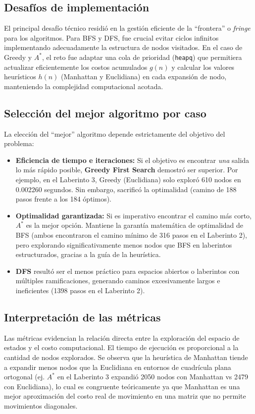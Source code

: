 \documentclass[12pt,a4paper]{article}
\begin{document}
\subsection{Desafíos de implementación}
El principal desafío técnico residió en la gestión eficiente de la ``frontera'' o \textit{fringe} para los algoritmos. Para BFS y DFS, fue crucial evitar ciclos infinitos implementando adecuadamente la estructura de nodos visitados. En el caso de Greedy y $A^*$, el reto fue adaptar una cola de prioridad (\texttt{heapq}) que permitiera actualizar eficientemente los costos acumulados $g(n)$ y calcular los valores heurísticos $h(n)$ (Manhattan y Euclidiana) en cada expansión de nodo, manteniendo la complejidad computacional acotada. 

\subsection{Selección del mejor algoritmo por caso}
La elección del ``mejor'' algoritmo depende estrictamente del objetivo del problema:
\begin{itemize}
    \item \textbf{Eficiencia de tiempo e iteraciones:} Si el objetivo es encontrar \textit{una} salida lo más rápido posible, \textbf{Greedy First Search} demostró ser superior. Por ejemplo, en el Laberinto 3, Greedy (Euclidiana) solo exploró 610 nodos en 0.002260 segundos. Sin embargo, sacrificó la optimalidad (camino de 188 pasos frente a los 184 óptimos).
    \item \textbf{Optimalidad garantizada:} Si es imperativo encontrar el camino más corto, \textbf{$A^*$} es la mejor opción. Mantiene la garantía matemática de optimalidad de BFS (ambos encontraron el camino mínimo de 316 pasos en el Laberinto 2), pero explorando significativamente menos nodos que BFS en laberintos estructurados, gracias a la guía de la heurística.
    \item \textbf{DFS} resultó ser el menos práctico para espacios abiertos o laberintos con múltiples ramificaciones, generando caminos excesivamente largos e ineficientes (1398 pasos en el Laberinto 2).
\end{itemize}

\subsection{Interpretación de las métricas}
Las métricas evidencian la relación directa entre la exploración del espacio de estados y el costo computacional. El tiempo de ejecución es proporcional a la cantidad de nodos explorados. Se observa que la heurística de Manhattan tiende a expandir menos nodos que la Euclidiana en entornos de cuadrícula plana ortogonal (ej. $A^*$ en el Laberinto 3 expandió 2050 nodos con Manhattan vs 2479 con Euclidiana), lo cual es congruente teóricamente ya que Manhattan es una mejor aproximación del costo real de movimiento en una matriz que no permite movimientos diagonales.
\end{document}
